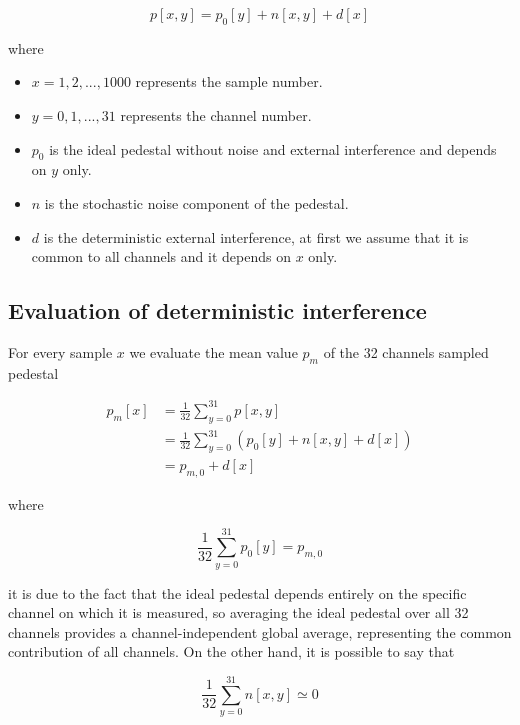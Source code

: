 \begin{equation} \label{eq1}
    p[x,y] = p_0[y] + n[x, y] + d[x]
\end{equation}

\noindent
where
\begin{itemize}
    \itemsep0em 
    \item $x=1,2,...,1000$ represents the sample number.
    \item $y=0,1,...,31$ represents the channel number.
    \item $p_0$ is the ideal pedestal without noise and external interference and depends on $y$ only.
    \item $n$ is the stochastic noise component of the pedestal.
    \item $d$ is the deterministic external interference, at first we assume that it is common to all channels and it depends on $x$ only.
\end{itemize}

\subsection{Evaluation of deterministic interference}
For every sample $x$ we evaluate the mean value $p_{m}$ of the 32 channels sampled pedestal

\begin{equation} \label{eq2}
    \begin{split}
        p_m[x] & = \frac{1}{32} \sum_{y=0}^{31} p[x,y] \\
        & = \frac{1}{32} \sum_{y=0}^{31} (p_0[y] + n[x, y] + d[x]) \\
        & = p_{m, 0} + d[x]
    \end{split}
\end{equation}

\noindent
where

\begin{equation}
     \frac{1}{32} \sum_{y=0}^{31} p_0[y] = p_{m, 0}
\end{equation}

\noindent
it is due to the fact that the ideal pedestal depends entirely on the specific channel on which it is measured, so averaging the ideal pedestal over all 32 channels provides a channel-independent global average, representing the common contribution of all channels. On the other hand, it is possible to say that

\begin{equation}
     \frac{1}{32} \sum_{y=0}^{31} n[x,y] \simeq 0
\end{equation}

